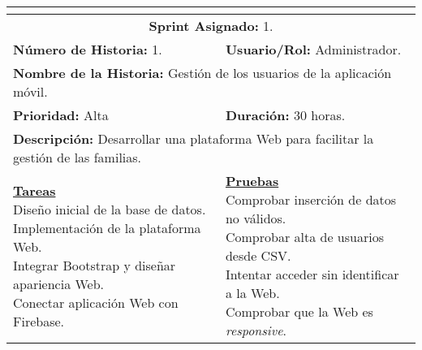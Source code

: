 \resizebox{15cm}{!} {
	\begin{tabular}{|l|l|}
		\hline
		\multicolumn{2}{|c|}{\cellcolor[HTML]{343434}{\color[HTML]{FFFFFF} \textbf{Historia de Usuario}}} \\
		\hline
		\multicolumn{2}{|c|}{\textbf{Sprint Asignado:} 1.} \\
		\hline
		\textbf{Número de Historia:} 1. & \textbf{Usuario/Rol:} Administrador.\\
		\hline
		\multicolumn{2}{|l|}{\textbf{Nombre de la Historia:} Gestión de los usuarios de la aplicación móvil.} \\
		\hline
		\textbf{Prioridad:} Alta & \textbf{Duración:} 30 horas.\\
		\hline
		\multicolumn{2}{|l|}{\textbf{Descripción:} Desarrollar una plataforma Web para facilitar la gestión de las familias.} \\
		\hline
		\specialcell{\underline{\textbf{Tareas}} \\ Diseño inicial de la base de datos. \\ Implementación de la plataforma Web. \\ Integrar Bootstrap y diseñar apariencia Web. \\ Conectar aplicación Web con Firebase.} & \specialcell{\underline{\textbf{Pruebas}} \\ Comprobar inserción de datos no válidos. \\ Comprobar alta de usuarios desde \acs{CSV}. \\ Intentar acceder sin identificar a la Web. \\ Comprobar que la Web es \textit{responsive}.} \\
		\hline
	\end{tabular}
}